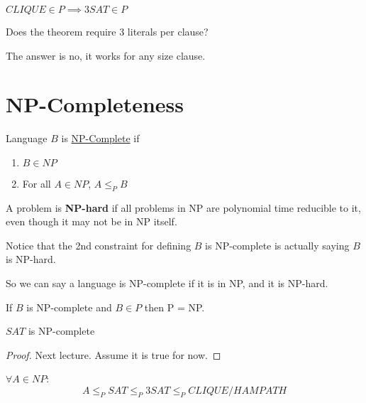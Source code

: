 \begin{corollary}
    \(CLIQUE \in P \implies 3SAT \in P\) 
\end{corollary}

\begin{remark}
    Does the theorem require 3 literals per clause?

    The answer is no, it works for any size clause.
\end{remark}


\section{NP-Completeness}

\begin{definition}
    Language \(B\) is  \underline{NP-Complete}  if
    \begin{enumerate}
        \item \(B \in NP\) 
        \item For all \(A \in NP\), \(A \leq_P B\)  
    \end{enumerate}

    \begin{remark}
        \begin{definition}[NP-hard]
            A problem is \textbf{NP-hard} if all problems in NP are polynomial time reducible to it, even though it may not be in NP itself.  
        \end{definition}

        Notice that the 2nd constraint for defining \(B\) is NP-complete is actually saying \(B\) is NP-hard.  

        So we can say a language is NP-complete if it is in NP, and it is NP-hard.
    \end{remark}
\end{definition}


If \(B\) is NP-complete and \(B \in P\) then P = NP. 

\begin{theorem}
    \(SAT\) is NP-complete 
\end{theorem}
\begin{proof}
    Next lecture. Assume it is true for now.
\end{proof}

\begin{note}
    \(\forall A \in NP\):
    \[
        A \leq_P SAT \leq_P 3SAT \leq_P CLIQUE/HAMPATH
    \]
\end{note}

